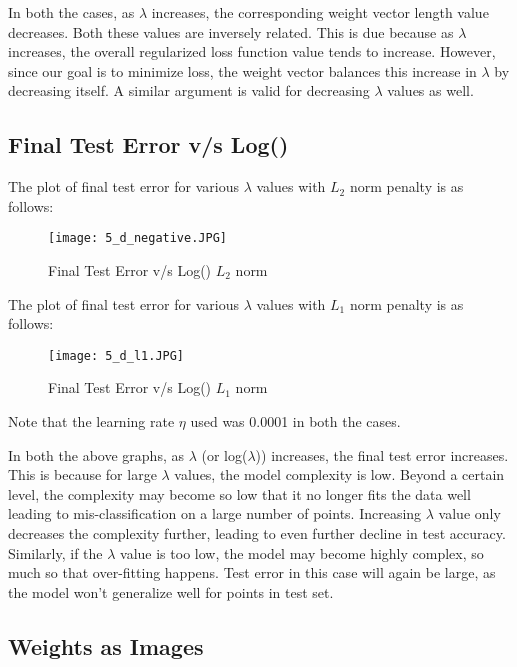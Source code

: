 \documentclass{article}
\begin{document}
In both the cases, as $\lambda$ increases, the corresponding weight vector length value decreases. Both these values are inversely related. This is due because as $\lambda$ increases, the overall regularized loss function value tends to increase. However, since our goal is to minimize loss, the weight vector balances this increase in $\lambda$ by decreasing itself. A similar argument is valid for decreasing $\lambda$ values as well.

\subsection{Final Test Error v/s Log(\lambda)}

The plot of final test error for various $\lambda$ values with $L_{2}$ norm penalty is as follows:

\begin{figure}
  \texttt{[image: 5\_d\_negative.JPG]}
  \caption{Final Test Error v/s Log(\lambda) $L_{2}$ norm}
  \label{fig:graph 5(d) l2}
\end{figure}

The plot of final test error for various $\lambda$ values with $L_{1}$ norm penalty is as follows:

\begin{figure}
  \texttt{[image: 5\_d\_l1.JPG]}
  \caption{Final Test Error v/s Log(\lambda) $L_{1}$ norm}
  \label{fig:graph 5(d) l1}
\end{figure}

Note that the learning rate $\eta$ used was 0.0001 in both the cases.

In both the above graphs, as $\lambda$ (or log($\lambda$)) increases, the final test error increases. This is because for large $\lambda$ values, the model complexity is low. Beyond a certain level, the complexity may become so low that it no longer fits the data well leading to mis-classification on a large number of points. Increasing $\lambda$ value only decreases the complexity further, leading to even further decline in test accuracy. Similarly, if the $\lambda$ value is too low, the model may become highly complex, so much so that over-fitting happens. Test error in this case will again be large, as the model won't generalize well for points in test set.

\subsection{Weights as Images}
\end{document}
